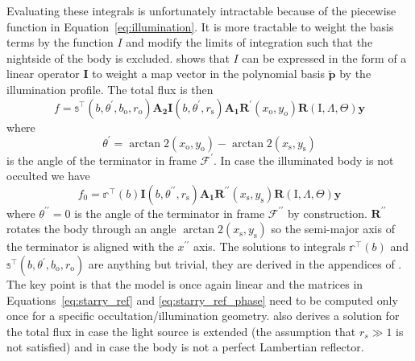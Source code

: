 \documentclass[12pt,dvipsnames]{report}
\begin{document}
Evaluating these integrals is unfortunately intractable because of the piecewise
function in Equation~\ref{eq:illumination}. It is more tractable to weight the basis
terms by the function $I$ and modify the limits of integration such that the nightside
of the body is excluded. \citet{2021arXiv210306275L} shows that $I$ can be expressed
in the form of a linear operator $\mathbf{I}$ to weight a map vector  in the polynomial
basis $\tilde{\mathbf{p}}$ by the illumination profile. The total flux is then
\begin{equation}
    f=\mathbb{s}^\intercal\left(b, \theta^{\prime}, b_{\mathrm{o}}, r_{\mathrm{o}}\right) \mathbf{A}_{\mathbf{2}} \mathbf{I}\left(b, \theta^{\prime}, r_{\mathrm{s}}\right) \mathbf{A}_{\mathbf{1}} \mathbf{R}^{\prime}\left(x_{\mathrm{o}}, y_{\mathrm{o}}\right) \mathbf{R}(\mathrm{I}, \Lambda, \Theta) \mathbf{y}
\end{equation}
where
\begin{equation}
    \theta^{\prime}=\arctan 2\left(x_{\mathrm{o}}, y_{\mathrm{o}}\right)-\arctan 2\left(x_{\mathrm{s}}, y_{\mathrm{s}}\right)
    \label{eq:starry_ref}
\end{equation}
is the angle of the terminator in frame $\mathcal{F}^\prime$.
In case the illuminated body is not occulted we have
\begin{equation}
    f_{0}=\mathbb{r}^{\intercal}(b) \mathbf{I}\left(b, \theta^{\prime \prime}, r_{\mathrm{s}}\right) \mathbf{A}_{\mathbf{1}} \mathbf{R}^{\prime \prime}\left(x_{\mathrm{s}}, y_{\mathrm{s}}\right) \mathbf{R}(\mathrm{I}, \Lambda, \Theta) \mathbf{y}
    \label{eq:starry_ref_phase}
\end{equation}
where $\theta^{\prime\prime}=0$ is the angle of the terminator in frame
$\mathcal{F}^{\prime\prime}$ by construction. $\mathbf{R}^{\prime\prime}$ rotates the
body through an angle $\arctan 2\left(x_{\mathrm{s}}, y_{\mathrm{s}}\right)$ so the
semi-major axis of the terminator is aligned with the $x^{\prime \prime}$ axis.
The solutions to integrals
$\mathbb{r}^{\intercal}(b)$ and $\mathbb{s}^{\intercal}\left(b, \theta^{\prime}, b_{\mathrm{o}}, r_{\mathrm{o}}\right)$
are anything but trivial, they are derived in the appendices of
\citet{2021arXiv210306275L}. The key point is that the model is once again linear and
the matrices in Equations~\ref{eq:starry_ref} and \ref{eq:starry_ref_phase} need to be
computed only once for a specific occultation/illumination geometry.
\citet{2021arXiv210306275L} also derives a solution for the total flux in case the
light source is extended (the assumption that $r_s\gg 1$ is not satisfied) and
in case the body is not a perfect Lambertian reflector.
\end{document}

